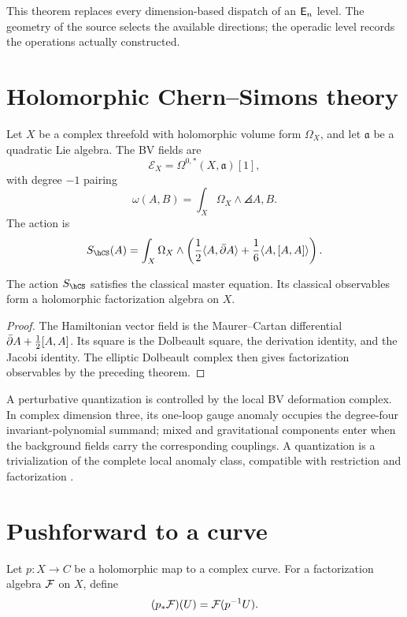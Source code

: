 This theorem replaces every dimension-based dispatch of an $\mathsf E_n$ level.  The geometry of the source selects the available directions; the operadic level records the operations actually constructed.

\chapter{Holomorphic Chern--Simons theory}
Let $X$ be a complex threefold with holomorphic volume form $\Omega_X$, and let $\mathfrak a$ be a quadratic Lie algebra. The BV fields are
\[
 \mathcal E_X=\Omega^{0,*}(X,\mathfrak a)[1],
\]
with degree $-1$ pairing
\[
 \omega(A,B)=\int_X\Omega_X\wedge\angles{A,B}.
\]
The action is
\[
 S_{\hCS}(A)=\int_X\Omega_X\wedge
 \left(\frac12\angles{A,\dbar A}+\frac16\angles{A,[A,A]}\right).
\]

\begin{theorem}
The action $S_{\hCS}$ satisfies the classical master equation. Its classical observables form a holomorphic factorization algebra on $X$.
\end{theorem}
\begin{proof}
The Hamiltonian vector field is the Maurer--Cartan differential $\bar\partial A+\frac12[A,A]$. Its square is the Dolbeault square, the derivation identity, and the Jacobi identity. The elliptic Dolbeault complex then gives factorization observables by the preceding theorem.
\end{proof}

A perturbative quantization is controlled by the local BV deformation complex. In complex dimension three, its one-loop gauge anomaly occupies the degree-four invariant-polynomial summand; mixed and gravitational components enter when the background fields carry the corresponding couplings. A quantization is a trivialization of the complete local anomaly class, compatible with restriction and factorization \cite{CostelloLiAnomaly}.

\chapter{Pushforward to a curve}
Let $p:X\to C$ be a holomorphic map to a complex curve. For a factorization algebra $\mathcal F$ on $X$, define
\[
 (p_*\mathcal F)(U)=\mathcal F(p^{-1}U).
\]

